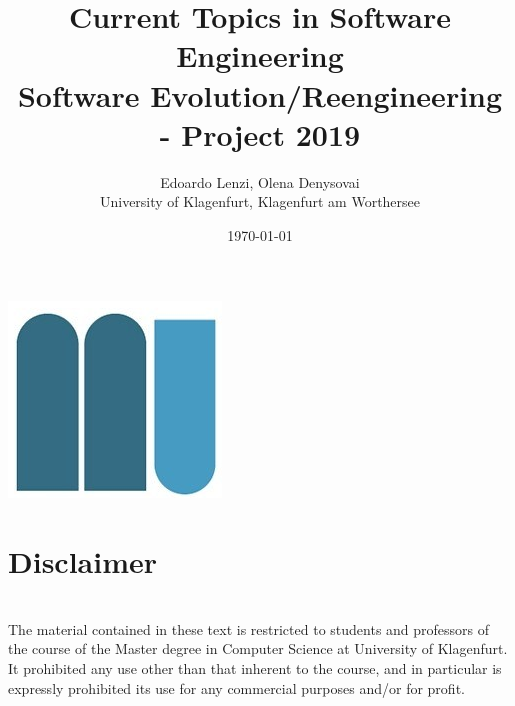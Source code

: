 \documentclass{memoir}
\title{
    Current Topics in Software Engineering\\[2pt] 
    \small{Software Evolution/Reengineering - Project 2019}}
\author{Edoardo Lenzi, Olena Denysovai\\ University of Klagenfurt, Klagenfurt am Worthersee}
\date{\today}
\begin{document}
\maketitle
\begin{center}
    \includegraphics[scale=0.5]{assets/klagenfurt.png}
\end{center}


\newpage
\tableofcontents
\newpage





%




\chapter*{Disclaimer}
$ $\\[10pt]
The material contained in these text is restricted to students and professors 
of the course of the Master degree in Computer Science at University of Klagenfurt.\\ 
      
It prohibited any use other than that inherent to the course, and in particular is 
expressly prohibited its use for any commercial purposes and/or for profit.
\end{document}
